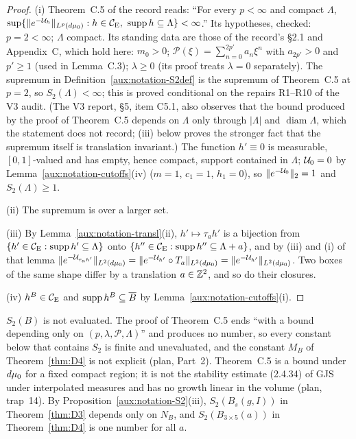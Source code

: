 \begin{proof}
(i) Theorem~C.5 of the record \cite[p.~41]{R} reads: ``For every $p<\infty$ and compact
$\Lambda$, $\sup\{\|e^{-\mathcal U_h}\|_{L^p(d\mu_0)}:h\in\mathcal{C}_{\mathrm E},\ \operatorname{supp} h\subseteq\Lambda\}<\infty$.''
Its hypotheses, checked: $p=2<\infty$; $\Lambda$ compact.  Its standing data are those of
the record's \S2.1 \cite[p.~6]{R} and Appendix~C, which hold here: $m_0>0$; $\mathscr
P(\xi)=\sum_{n=0}^{2p'}a_n\xi^n$ with $a_{2p'}>0$ and $p'\ge1$ (used in Lemma~C.3); $\lambda\ge0$
(its proof treats $\lambda=0$ separately).  The supremum in
Definition~\ref{aux:notation-S2def} is the supremum of Theorem~C.5 at $p=2$, so
$S_2(\Lambda)<\infty$; this is proved conditional on the repairs R1--R10 of the V3 audit.  (The
V3 report, \S5, item C5.1, also observes that the bound produced by the proof of Theorem~C.5
depends on $\Lambda$ only through $|\Lambda|$ and $\operatorname{diam}\Lambda$, which the
statement does not record; (iii) below proves the stronger fact that the supremum itself is
translation invariant.)  The function $h'\equiv0$ is measurable, $[0,1]$-valued and has empty,
hence compact, support contained in $\Lambda$; $\mathcal U_0=0$ by
Lemma~\ref{aux:notation-cutoffs}(iv) ($m=1$, $c_1=1$, $h_1=0$), so $\|e^{-\mathcal U_0}\|_2=1$ and
$S_2(\Lambda)\ge1$.

(ii) The supremum is over a larger set.

(iii) By Lemma~\ref{aux:notation-transl}(ii), $h'\mapsto\tau_ah'$ is a bijection from
$\{h'\in\mathcal{C}_{\mathrm E}:\operatorname{supp} h'\subseteq\Lambda\}$ onto $\{h''\in\mathcal{C}_{\mathrm E}:\operatorname{supp} h''\subseteq\Lambda+a\}$, and
by (iii) and (i) of that lemma
$\|e^{-\mathcal U_{\tau_ah'}}\|_{L^2(d\mu_0)}=\|e^{-\mathcal U_{h'}}\circ T_a\|_{L^2(d\mu_0)}=
\|e^{-\mathcal U_{h'}}\|_{L^2(d\mu_0)}$.  Two boxes of the same shape differ by a translation
$a\in\mathbb{Z}^2$, and so do their closures.

(iv) $h^B\in\mathcal{C}_{\mathrm E}$ and $\operatorname{supp} h^B\subseteq\overline B$ by
Lemma~\ref{aux:notation-cutoffs}(i).
\end{proof}

\begin{auxrem}\label{aux:notation-S2rem}
$S_2(B)$ is not evaluated.  The proof of Theorem~C.5 ends ``with a bound depending only on
$(p,\lambda,\mathscr P,\Lambda)$'' \cite[p.~41]{R} and produces no number, so every constant
below that contains $S_2$ is finite and unevaluated, and the constant $M_B$ of
Theorem~\ref{thm:D4} is not explicit (plan, Part~2).  Theorem~C.5 is a bound under $d\mu_0$ for
a fixed compact region; it is not the stability estimate (2.4.34) of GJS under interpolated
measures and has no growth linear in the volume (plan, trap~14).  By
Proposition~\ref{aux:notation-S2}(iii), $S_2(B_s(g,I))$ in Theorem~\ref{thm:D3} depends only
on $N_B$, and $S_2(B_{3\times5}(a))$ in Theorem~\ref{thm:D4} is one number for all $a$.
\end{auxrem}

